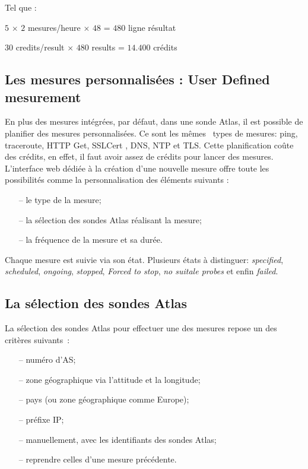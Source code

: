 Tel que :

\begin{tcolorbox}
	\begin{center}
		$5$ $\times$ $2$ mesures/heure $\times$ $48$ = $480$ ligne résultat
		
		$30$ credits/result $\times$ $480$ results = $14.400$ crédits
	\end{center}
\end{tcolorbox}	

\subsection{Les mesures personnalisées : User Defined mesurement} \label{par:udm}

En plus des mesures intégrées, par défaut, dans une sonde Atlas, il est possible de planifier des mesures personnalisées. Ce sont les m\^{e}mes~  types de mesures: ping, traceroute,  HTTP Get, SSLCert , DNS, NTP et TLS. Cette planification coûte des crédits, en effet, il faut avoir assez de crédits pour lancer des mesures. L'interface web dédiée à la création d'une nouvelle mesure offre toute les possibilités comme la personnalisation des éléments suivants :
\begin{itemize}
	\item[--] le type de la mesure;
	\item[--] la sélection des sondes Atlas réalisant la mesure;
	\item[--] la fréquence de la mesure et sa durée.
\end{itemize}

Chaque mesure est suivie via son état. Plusieurs états à distinguer: \textit{specified}, \textit{scheduled}, \textit{ongoing}, \textit{stopped},  \textit{Forced to stop},  \textit{no suitale probes} et enfin  \textit{failed}.



\subsection{La sélection des sondes Atlas}

La sélection des sondes  Atlas pour effectuer une des mesures repose un des critères suivants~: 
\begin{itemize}
	\item[--] numéro d'AS;
	\item[--] zone géographique via  l'attitude et la longitude;
	\item[--] pays (ou zone géographique comme  Europe);
	\item[--] préfixe IP; %
	\item[--] manuellement, avec les identifiants des sondes Atlas;
	\item[--] reprendre celles d'une  mesure précédente.
\end{itemize}

